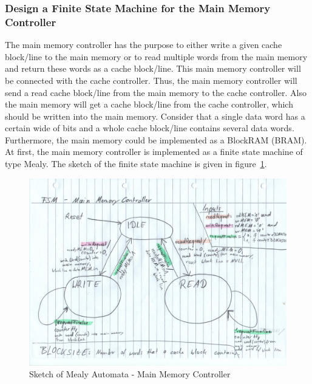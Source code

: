 \subsubsection{Design a Finite State Machine for the Main Memory Controller}
The main memory controller has the purpose to either write a given cache block/line to the main memory or to read multiple words from the main memory and return these words as a cache block/line. This main memory controller will be connected with the cache controller. Thus, the main memory controller will send a read cache block/line from the main memory to the cache controller. Also the main memory will get a cache block/line from the cache controller, which should be written into the main memory. Consider that a single data word has a certain wide of bits and a whole cache block/line contains several data words. Furthermore, the main memory could be implemented as a BlockRAM (BRAM). At first, the main memory controller is implemented as a finite state machine of type Mealy. The sketch of the finite state machine is given in figure~\ref{fig:sketchMealyAutomataMainMemoryController}.
\begin{figure}
	\centering
	\includegraphics[scale=.5,angle=270]{pictures/sketch_mealyAutomata_mainMemoryController}
	\caption{Sketch of Mealy Automata - Main Memory Controller}
	\label{fig:sketchMealyAutomataMainMemoryController}
\end{figure}


\newpage
